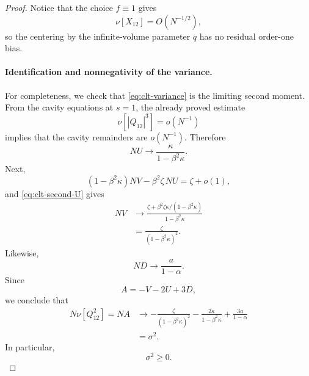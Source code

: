\begin{proof}
Notice that the choice $f\equiv1$ gives
\begin{equation}
 \nu[X_{12}]
 =
 O(N^{-1/2}),
 \label{eq:clt-bias}
\end{equation}
so the centering by the infinite-volume parameter $q$ has no residual
order-one bias.

\paragraph{Identification and nonnegativity of the variance.}
For completeness, we check that \eqref{eq:clt-variance} is the limiting
second moment.  From the cavity equations at $s=1$, the already proved
estimate
\[
 \nu[|Q_{12}|^3]=o(N^{-1})
\]
implies that the cavity remainders are $o(N^{-1})$.  Therefore
\begin{equation}
 NU
 \longrightarrow
 \frac{\kappa}{1-\beta^2\kappa}.
 \label{eq:clt-second-U}
\end{equation}
Next,
\[
 (1-\beta^2\kappa)NV
 -
 \beta^2\zeta\,NU
 =
 \zeta+o(1),
\]
and \eqref{eq:clt-second-U} gives
\begin{align}
 NV
 &\longrightarrow
 \frac{
 \zeta+
 \beta^2\zeta\kappa/(1-\beta^2\kappa)
 }{1-\beta^2\kappa}
 \nonumber\\
 &=
 \frac{\zeta}{(1-\beta^2\kappa)^2}.
 \label{eq:clt-second-V}
\end{align}
Likewise,
\begin{equation}
 ND
 \longrightarrow
 \frac{a}{1-\alpha}.
 \label{eq:clt-second-D}
\end{equation}
Since
\[
 A=-V-2U+3D,
\]
we conclude that
\begin{align}
 N\nu[Q_{12}^2]
 =NA
 &\longrightarrow
 -\frac{\zeta}{(1-\beta^2\kappa)^2}
 -\frac{2\kappa}{1-\beta^2\kappa}
 +\frac{3a}{1-\alpha}
 \nonumber\\
 &=\sigma^2.
 \label{eq:clt-second-moment-limit}
\end{align}
In particular,
\begin{equation}
 \sigma^2\ge0.
 \label{eq:clt-variance-nonnegative}
\end{equation}


\end{proof}
